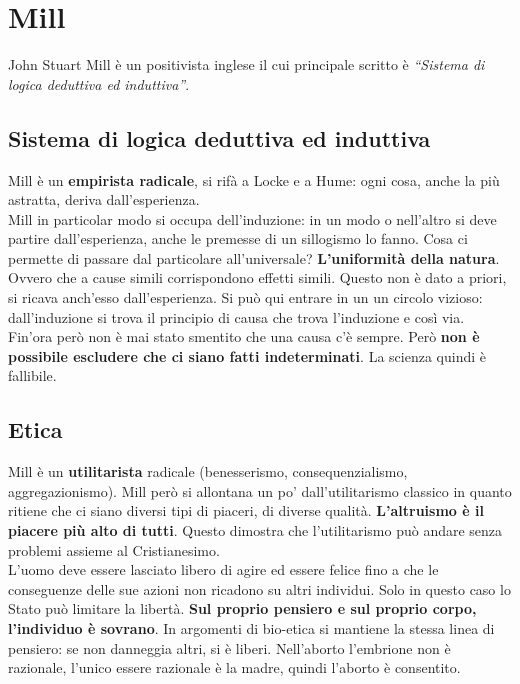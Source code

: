 
\section{Mill}
John Stuart Mill è un positivista inglese il cui principale scritto è \textit{``Sistema di logica 
deduttiva ed induttiva''}. 

\subsection{Sistema di logica deduttiva ed induttiva}
Mill è un \textbf{empirista radicale}, si rifà a Locke e a Hume: ogni cosa, anche la più astratta,
deriva dall'esperienza.\\
Mill in particolar modo si occupa dell'induzione: in un modo o nell'altro
si deve partire dall'esperienza, anche le premesse di un sillogismo lo fanno. Cosa ci permette di
passare dal particolare all'universale? \textbf{L'uniformità della natura}. Ovvero che a cause simili
corrispondono effetti simili. Questo non è dato a priori, si ricava anch'esso dall'esperienza. Si
può qui entrare in un un circolo vizioso: dall'induzione si trova il principio di causa che trova
l'induzione e così via. Fin'ora però non è mai stato smentito che una causa c'è sempre. Però
\textbf{non è possibile escludere che ci siano fatti indeterminati}. La scienza quindi è fallibile. 

\subsection{Etica}
Mill è un \textbf{utilitarista} radicale (benesserismo, consequenzialismo, aggregazionismo). Mill
però si allontana un po' dall'utilitarismo classico in quanto ritiene che ci siano diversi tipi di
piaceri, di diverse qualità. \textbf{L'altruismo è il piacere più alto di tutti}. Questo dimostra
che l'utilitarismo può andare senza problemi assieme al Cristianesimo.\\
L'uomo deve essere lasciato libero di agire ed essere felice fino a che le conseguenze delle sue 
azioni non ricadono su altri individui. Solo in questo caso lo Stato può limitare la libertà. 
\textbf{Sul proprio pensiero e sul proprio corpo, l'individuo è sovrano}. In argomenti di bio-etica
si mantiene la stessa linea di pensiero: se non danneggia altri, si è liberi. Nell'aborto l'embrione
non è razionale, l'unico essere razionale è la madre, quindi l'aborto è consentito.


